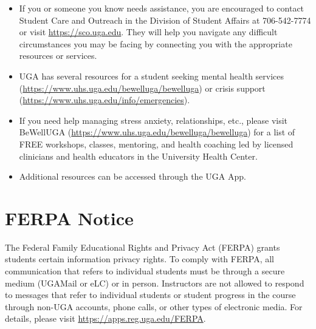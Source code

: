 \documentclass[12pt]{article}
\begin{document}
\begin{itemize}
  \item If you or someone you know needs assistance, you are
    encouraged to contact Student Care and Outreach in the Division of
    Student Affairs at 706-542-7774 or visit \url{https://sco.uga.edu}. They
    will help you navigate any difficult circumstances you may be facing
    by connecting you with the appropriate resources or services.
  \item UGA has several resources for a student seeking mental health
    services (\url{https://www.uhs.uga.edu/bewelluga/bewelluga}) or crisis
    support (\url{https://www.uhs.uga.edu/info/emergencies}).
  \item If you need help managing stress anxiety, relationships, etc.,
    please visit BeWellUGA (\url{https://www.uhs.uga.edu/bewelluga/bewelluga})
    for a list of FREE workshops, classes, mentoring, and health
    coaching led by licensed clinicians and health educators in the
    University Health Center.
  \item Additional resources can be accessed through the UGA App.
\end{itemize}




\vspace{-2mm}
\section*{\normalsize FERPA Notice}
\vspace{-4mm}

The Federal Family Educational Rights and Privacy Act (FERPA) grants
students certain information privacy rights. To comply with FERPA, all
communication that refers to individual students must be through a
secure medium (UGAMail or eLC) or in person. Instructors are not
allowed to respond to messages that refer to individual students or
student progress in the course through non-UGA accounts, phone calls,
or other types of electronic media. For details, please visit
\url{https://apps.reg.uga.edu/FERPA}. 
\end{document}
